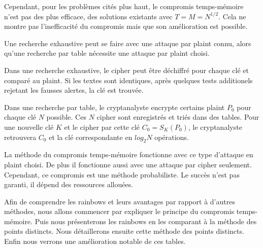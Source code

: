 		\bigskip

		Cependant, pour les problèmes cités plus haut, le compromis temps-mémoire n'est pas des plus efficace, des solutions existants avec $T = M = N^{1/2}$. Cela ne montre pas l'inefficacité du compromis mais que son amélioration est possible.

		\bigskip

		Une recherche exhaustive peut se faire avec une attaque par \gls{plaint} connu, alors qu'une recherche par table nécessite une attaque par \gls{plaint} choisi.

		\bigskip

		Dans une recherche exhaustive, le \gls{cipher} peut être déchiffré pour chaque clé et comparé au \gls{plaint}. Si les textes sont identiques, après quelques tests additionels rejetant les fausses alertes, la clé est trouvée.

		\bigskip

		Dans une recherche par table, le cryptanalyste encrypte certains \gls{plaint} $P_0$ pour chaque clé $N$ possible. Ces $N$ \gls{cipher} sont enregistrés et triés dans des tables. Pour une nouvelle clé $K$ et le \gls{cipher} par cette clé $C_0 = S_K(P_0)$, le cryptanalyste retrouvera $C_0$ et la clé correspondante en $log_2 N$ opérations.

		\bigskip

		La méthode du compromis temps-mémoire fonctionne avec ce type d'attaque en \gls{plaint} choisi. De plus il fonctionne aussi avec une attaque par \gls{cipher} seulement. Cependant, ce compromis est une méthode probabiliste. Le succès n'est pas garanti, il dépend des ressources allouées.

		\bigskip

		Afin de comprendre les \glspl{rainbow} et leurs avantages par rapport à d'autres méthodes, nous allons commencer par expliquer le principe du compromis temps-mémoire. Puis nous présenterons les \glspl{rainbow} en les comparant à la méthode des points distincts. Nous détaillerons ensuite cette méthode des points distincts. Enfin nous verrons une amélioration notable de ces tables.

\endinput{}
